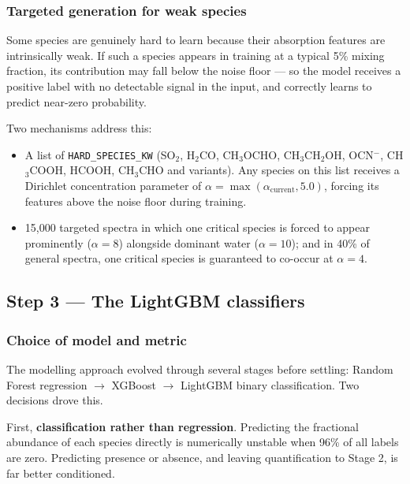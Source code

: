 \documentclass[11pt,a4paper]{article}
\newcommand{\code}[1]{\texttt{\small #1}}
\newcommand{\ocn}{OCN$^-$}
\begin{document}
\subsubsection*{Targeted generation for weak species}

Some species are genuinely hard to learn because their absorption features
are intrinsically weak. If such a species appears in training at a typical
5\% mixing fraction, its contribution may fall below the noise floor --- so
the model receives a positive label with no detectable signal in the input,
and correctly learns to predict near-zero probability.

Two mechanisms address this:

\begin{itemize}
  \item A list of \code{HARD\_SPECIES\_KW} (SO$_2$, H$_2$CO, CH$_3$OCHO,
        CH$_3$CH$_2$OH, \ocn, CH$_3$COOH, HCOOH, CH$_3$CHO and
        variants). Any species on this list receives a Dirichlet
        concentration parameter of $\alpha = \max(\alpha_{\text{current}},
        5.0)$, forcing its features above the noise floor during training.
  \item 15{,}000 targeted spectra in which one critical species is forced
        to appear prominently ($\alpha = 8$) alongside dominant water
        ($\alpha = 10$); and in 40\% of general spectra, one critical
        species is guaranteed to co-occur at $\alpha = 4$.
\end{itemize}

\subsection{Step 3 --- The LightGBM classifiers}

\subsubsection*{Choice of model and metric}

The modelling approach evolved through several stages before settling:
Random Forest regression $\rightarrow$ XGBoost $\rightarrow$ LightGBM
binary classification. Two decisions drove this.

First, \textbf{classification rather than regression}. Predicting the
fractional abundance of each species directly is numerically unstable when
96\% of all labels are zero. Predicting presence or absence, and leaving
quantification to Stage 2, is far better conditioned.
\end{document}
